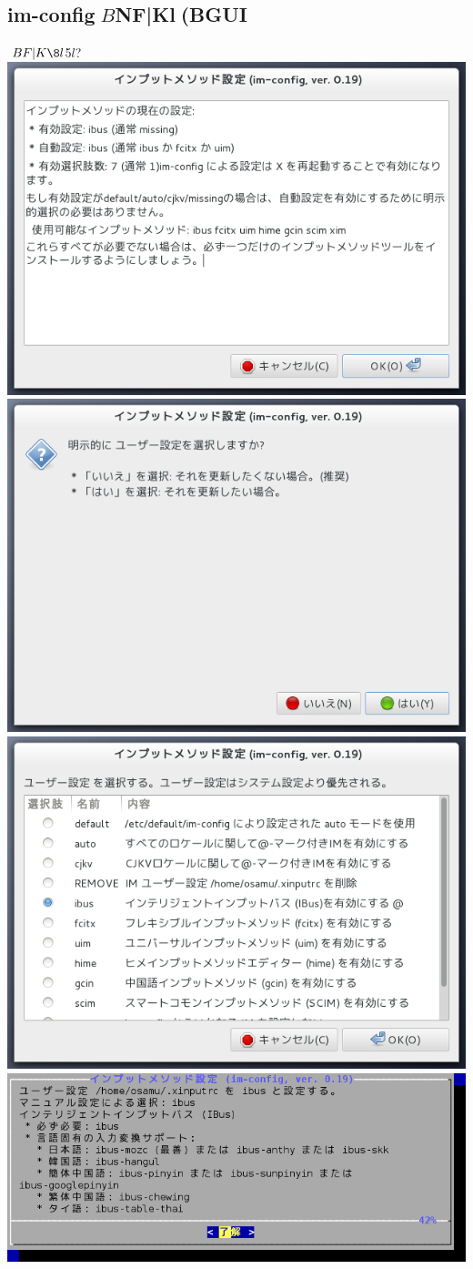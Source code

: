 \documentclass[mingoth,a4paper]{jsarticle}
\begin{document}
{{{{{{{{{{{{{\subsection{im-config$B$NF|K\8l(BGUI}
$BF|K\8l$5$l$?%
\includegraphics[width=0.7\hsize]{image201212/im04.png}
\includegraphics[width=0.7\hsize]{image201212/im05.png}
\includegraphics[width=0.7\hsize]{image201212/im06.png}
\includegraphics[width=0.7\hsize]{image201212/im07.png}

}}}}}}}}}}}}}
\end{document}
